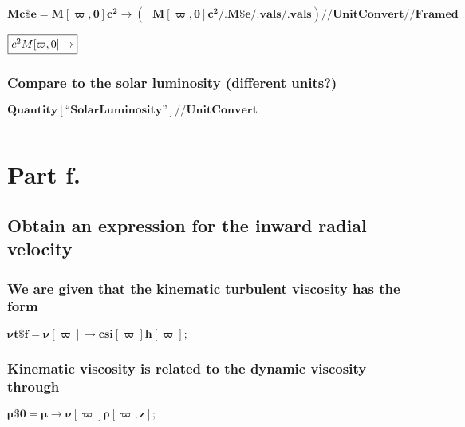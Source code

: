 \documentclass{article}
\begin{document}
\begin{doublespace}
\noindent\(\pmb{\text{Mc$\$$e} = M[\varpi ,0]c^2\to \left(\text{  }M[\varpi ,0]c^2\text{/.} \text{M$\$$e}\text{/.} \text{vals} \text{/.} \text{vals}\right)
\text{//}\text{UnitConvert} \text{//}\text{Framed}}\)
\end{doublespace}

\begin{doublespace}
\noindent\(\fbox{$c^2 M[\varpi ,0]\to $}\)
\end{doublespace}

\subsubsection*{Compare to the solar luminosity (different units?)}

\begin{doublespace}
\noindent\(\pmb{\text{Quantity}[\text{{``}SolarLuminosity{''}}]\text{//}\text{UnitConvert}}\)
\end{doublespace}

\begin{doublespace}
\noindent\(\)
\end{doublespace}

\section*{Part f.}

\subsection*{Obtain an expression for the inward radial velocity}

\subsubsection*{We are given that the kinematic turbulent viscosity has the form}

\begin{doublespace}
\noindent\(\pmb{\text{$\nu $t$\$$f} = \nu [\varpi ]\to  \text{csi}[\varpi ] h[\varpi ];}\)
\end{doublespace}

\subsubsection*{Kinematic viscosity is related to the dynamic viscosity through}

\begin{doublespace}
\noindent\(\pmb{\text{$\mu \$$0} = \mu  \to  \nu [\varpi ]\rho [\varpi ,z];}\)
\end{doublespace}
\end{document}
